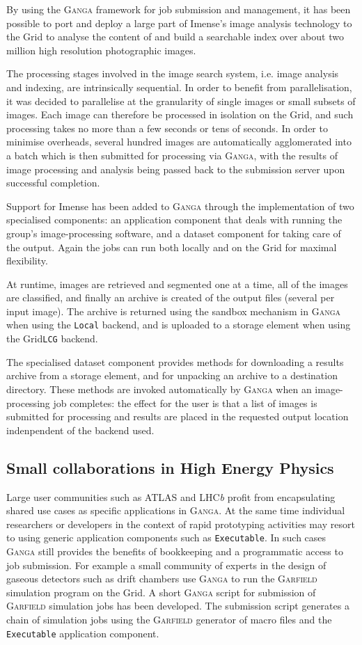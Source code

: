 \documentclass{elsart}
\def\lhcb {LHC{\em b\/}\xspace}
\def\atlas {ATLAS\xspace}
\def\ganga {\textsc{Ganga}\xspace}
\def\garfield {\textsc{Garfield}\xspace}
\def\grid {Grid\xspace}
\newcommand{\code}[1]{\texttt{#1}}
\begin{document}
By using the \ganga framework for job submission and management, it has been
possible to port and deploy a large part of Imense's image analysis technology
to the \grid to analyse the content of and build a searchable index over about
two million high resolution photographic images.

The processing stages involved in the image search system, i.e. image analysis
and indexing, are intrinsically sequential. In order to benefit from
parallelisation, it was decided to parallelise at the granularity of single
images or small subsets of images. Each image can therefore be processed in
isolation on the \grid, and such processing takes no more than a few seconds
or tens of seconds. In order to minimise overheads, several hundred images are
automatically agglomerated into a batch which is then submitted for processing
via \ganga, with the results of image processing and analysis being passed
back to the submission server upon successful completion.

Support for Imense has been added to \ganga through the implementation of two
specialised components: an application component that deals with running the
group's image-processing software, and a dataset component for taking care of
the output. Again the jobs can run both locally and on the \grid for maximal
flexibility.

At runtime, images are retrieved and segmented one at a time, all of the
images are classified, and finally an archive is created of the output files
(several per input image).  The archive is returned using the sandbox
mechanism in \ganga when using the \code{Local} backend, and is uploaded to a
storage element when using the \grid \code{LCG} backend.

The specialised dataset component provides methods for downloading a results
archive from a storage element, and for unpacking an archive to a destination
directory. These methods are invoked automatically by \ganga when an
image-processing job completes: the effect for the user is that a list of
images is submitted for processing and results are placed in the requested
output location indenpendent of the backend used.

\subsection{Small collaborations in High Energy Physics}
\label{sec:smallHEP}
Large user communities such as \atlas and \lhcb profit from encapsulating
shared use cases as specific applications in \ganga. At the same time
individual researchers or developers in the context of rapid prototyping
activities may resort to using generic application components such as
\code{Executable}. In such cases \ganga still provides the benefits of
bookkeeping and a programmatic access to job submission. For example a small
community of experts in the design of gaseous detectors such as drift chambers
use \ganga to run the \garfield~\cite{Garfield} simulation program on the
\grid.  A short \ganga script for submission of \garfield simulation jobs has
been developed. The submission script generates a chain of simulation jobs
using the \garfield generator of macro files and the \code{Executable}
application component.
\end{document}
